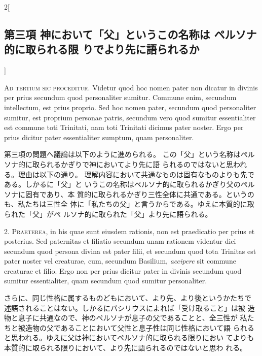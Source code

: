 \documentclass[paper=a4paper,fontsize=10pt,jafontsize=9pt,titlepage]{jlreq}
\begin{document}
\begin{paracol}{2}[\subsection{第三項 神において「父」というこの名称は ペルソナ的に取られる限 りでより先に語られるか}]

{\scshape Ad tertium sic proceditur}. Videtur quod hoc nomen pater non dicatur in
divinis per prius secundum quod personaliter sumitur. Commune enim,
secundum intellectum, est prius proprio. Sed hoc nomen pater, secundum
quod personaliter sumitur, est proprium personae patris, secundum vero
quod sumitur essentialiter est commune toti Trinitati, nam toti
Trinitati dicimus pater noster. Ergo per prius dicitur pater
essentialiter sumptum, quam personaliter.


\switchcolumn


第三項の問題へ議論は以下のように進められる。
この「父」という名称はペルソナ的に取られるかぎりで神においてより先に語
 られるのではないと思われる。理由は以下の通り。
理解内容において共通なものは固有なものよりも先である。しかるに「父」と
 いうこの名称はペルソナ的に取られるかぎり父のペルソナに固有であり、本
 質的に取られるかぎり三性全体に共通である。というのも、私たちは三性全
 体に「私たちの父」と言うからである。ゆえに本質的に取られた「父」がペ
 ルソナ的に取られた「父」より先に語られる。




2. {\scshape Praeterea}, in his quae sunt eiusdem rationis, non est praedicatio per
prius et posterius. Sed paternitas et filiatio secundum unam rationem
videntur dici secundum quod persona divina est pater filii, et
secundum quod tota Trinitas est pater noster vel creaturae, cum,
secundum Basilium, {\itshape accipere} sit commune creaturae et filio. Ergo non
per prius dicitur pater in divinis secundum quod sumitur
essentialiter, quam secundum quod sumitur personaliter.


\switchcolumn


さらに、同じ性格に属するものどもにおいて、より先、より後というかたちで
 述語されることはない。しかるにバシリウスによれば「受け取ること」は被
 造物と息子に共通なので、神のペルソナが息子の父であることと、全三性が
 私たちと被造物の父であることにおいて父性と息子性は同じ性格において語
 られると思われる。ゆえに父は神においてペルソナ的に取られる限りにおい
 てよりも本質的に取られる限りにおいて、より先に語られるのではないと思わ
 れる。



\end{paracol}
\end{document}
